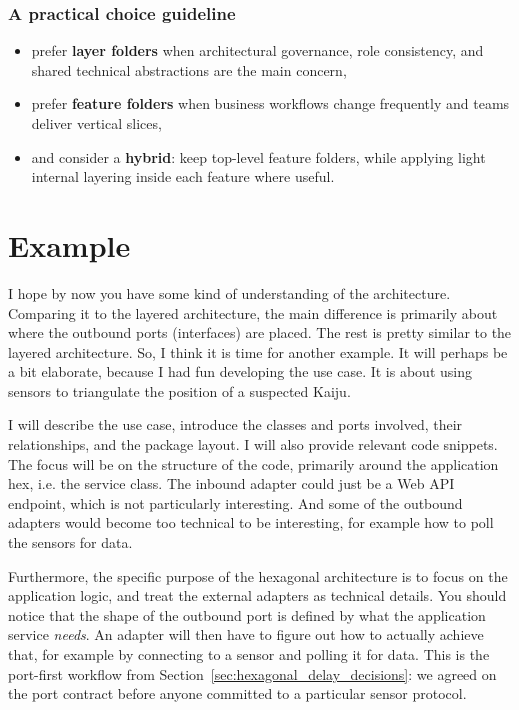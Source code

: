 \subsubsection{A practical choice guideline}

\begin{itemize}
    \item prefer \textbf{layer folders} when architectural governance, role consistency, and shared technical abstractions are the main concern,
    \item prefer \textbf{feature folders} when business workflows change frequently and teams deliver vertical slices,
    \item and consider a \textbf{hybrid}: keep top-level feature folders, while applying light internal layering inside each feature where useful.
\end{itemize}


\section{Example}
\label{sec:hexagonal_example}

I hope by now you have some kind of understanding of the architecture. Comparing it to the layered architecture, the main difference is primarily about where the outbound ports (interfaces) are placed. The rest is pretty similar to the layered architecture. So, I think it is time for another example. It will perhaps be a bit elaborate, because I had fun developing the use case. It is about using sensors to triangulate the position of a suspected Kaiju.

I will describe the use case, introduce the classes and ports involved, their relationships, and the package layout. I will also provide relevant code snippets. The focus will be on the structure of the code, primarily around the application hex, i.e. the service class. The inbound adapter could just be a Web API endpoint, which is not particularly interesting. And some of the outbound adapters would become too technical to be interesting, for example how to poll the sensors for data. 

Furthermore, the specific purpose of the hexagonal architecture is to focus on the application logic, and treat the external adapters as technical details. You should notice that the shape of the outbound port is defined by what the application service \textit{needs}. An adapter will then have to figure out how to actually achieve that, for example by connecting to a sensor and polling it for data. This is the port-first workflow from Section~\ref{sec:hexagonal_delay_decisions}: we agreed on the port contract before anyone committed to a particular sensor protocol.

